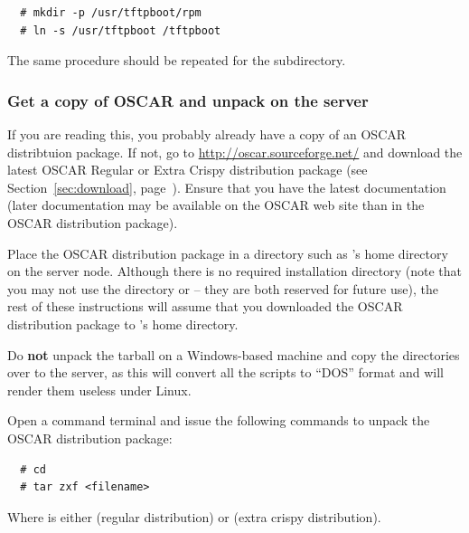 \begin{verbatim}
  # mkdir -p /usr/tftpboot/rpm
  # ln -s /usr/tftpboot /tftpboot
\end{verbatim}

The same procedure should be repeated for the
 subdirectory.

    
\subsubsection{Get a copy of OSCAR and unpack on the server} 
\label{det:unpack}

If you are reading this, you probably already have a copy of an OSCAR
distribtuion package.  If not, go to
\url{http://oscar.sourceforge.net/} and download the latest OSCAR
Regular or Extra Crispy distribution package (see
Section~\ref{sec:download}, page~\pageref{sec:download}).  Ensure that
you have the latest documentation (later documentation may be
available on the OSCAR web site than in the OSCAR distribution
package).

Place the OSCAR distribution package in a directory such as
's home directory on the server node.  Although there is no
required installation directory (note that you may not use the
directory  or  -- they are
both reserved for future use), the rest of these instructions will
assume that you downloaded the OSCAR distribution package to
's home directory.

Do {\bf not} unpack the tarball on a Windows-based machine and copy
the directories over to the server, as this will convert all the
scripts to ``DOS'' format and will render them useless under Linux.

Open a command terminal and issue the following commands to unpack the
OSCAR distribution package:

\begin{verbatim}
  # cd
  # tar zxf <filename>
\end{verbatim}

Where  is either
 (regular distribution) or
 (extra crispy
distribution).

\def\obase{$^\sim$/oscar-\oscarversion}

